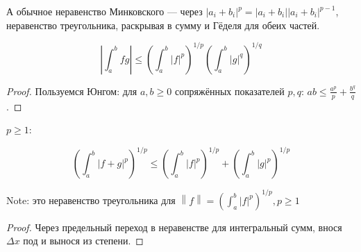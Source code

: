 \documentclass[12pt, a4paper]{article}
\begin{document}
    А обычное неравенство Минковского — через $|a_i + b_i|^p = |a_i + b_i||a_i + b_i|^{p - 1}$, неравенство треугольника, раскрывая в сумму и Гёделя для обеих частей.


    \begin{theorem}

        \begin{equation}
            \left| \int^b_a fg \right| \leqslant \left(\int^b_a |f|^p\right)^{1/p} \left(\int^b_a |g|^q\right)^{1/q}
        \end{equation}

        \begin{proof}
            Пользуемся Юнгом: для $a, b \geqslant 0$ сопряжённых показателей $p, q$: $ab \leqslant \frac{a^p}{p} + \frac{b^q}{q}$.
        \end{proof}
    \end{theorem}


    \begin{theorem}
        
        $p \geqslant 1$:

        \begin{equation}
            \left(\int^b_a |f + g|^p\right)^{1/p} \leqslant \left(\int^b_a |f|^p\right)^{1/p} + \left(\int^b_a |g|^p\right)^{1/p}
        \end{equation}

        Note: это неравенство треугольника для $\left\| f \right\| = \left(\int^b_a |f|^p\right)^{1/p}, p \geqslant 1$

        \begin{proof}
            Через предельный переход в неравенстве для интегральный сумм, внося $\Delta x$ под и вынося из степени.
        \end{proof} 
    \end{theorem}
\end{document}
